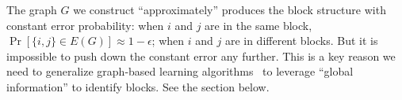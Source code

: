  The graph $G$ we construct ``approximately'' produces the block structure with constant error probability: when $i$ and $j$ 
are in the same block, $\Pr[\{i, j\} \in E(G)] \approx 1 - \epsilon$; when $i$ and $j$ are in different blocks. But it is impossible to push down the constant error any further. This is a key reason we need to generalize graph-based learning algorithms~\cite{rohe2011spectral,abraham2015low} to leverage ``global information'' to identify blocks. See the section below.  


